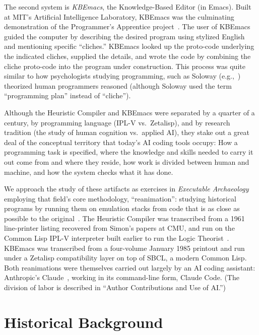 \documentclass[11pt]{article}
\begin{document}
The second system is \emph{KBEmacs}, the Knowledge-Based Editor (in
Emacs). Built at MIT's Artificial Intelligence Laboratory, KBEmacs was
the culminating demonstration of the Programmer's Apprentice
project~\cite{waters1985tr,waters1986aimag,richwaters1987overview}.
The user of KBEmacs guided the computer by describing the desired
program using stylized English and mentioning specific
``cliches.'' KBEmacs looked up the proto-code underlying the indicated
cliches, supplied the details, and wrote the code by combining the
cliche proto-code into the program under construction. This process
was quite similar to how psychologists studying programming, such as
Soloway (e.g.,~\cite{soloway1984}) theorized human programmers
reasoned (although Soloway used the term ``programming plan'' instead
of ``cliche'').

Although the Heuristic Compiler and KBEmacs were separated by a
quarter of a century, by programming language (IPL-V vs.\ Zetalisp),
and by research tradition (the study of human cognition vs.\ applied
AI), they stake out a great deal of the conceptual territory that
today's AI coding tools occupy: How a programming task is specified,
where the knowledge and skills needed to carry it out come from and
where they reside, how work is divided between human and machine, and
how the system checks what it has done.

We approach the study of these artifacts as exercises in
\emph{Executable Archaeology} employing that field's core methodology,
``reanimation'': studying historical programs by running them on
emulation stacks from code that is as close as possible to the
original~\cite{lane2025eliza,moewsshrager2026}. The Heuristic Compiler
was transcribed from a 1961 line-printer listing recovered from
Simon's papers at CMU, and run on the Common Lisp IPL-V interpreter
built earlier to run the Logic Theorist~\cite{shrager2026}. KBEmacs
was transcribed from a four-volume January 1985 printout and run under
a Zetalisp compatibility layer on top of SBCL, a modern Common
Lisp. Both reanimations were themselves carried out largely by an AI
coding assistant: Anthropic's Claude~\cite{claude}, working in its
command-line form, Claude Code. (The division of labor is described in
``Author Contributions and Use of AI.'')

\section{Historical Background}
\label{sec:history}
\end{document}
